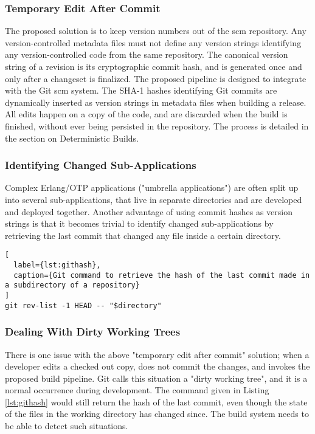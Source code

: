 \subsubsection{Temporary Edit After Commit}
The proposed solution is to keep version numbers out of the \acrfull{scm} repository. Any version-controlled metadata files must not define any version strings identifying any version-controlled code from the same repository. The canonical version string of a revision is its cryptographic commit hash, and is generated once and only after a changeset is finalized. The proposed pipeline is designed to integrate with the Git \acrshort{scm} system. The SHA-1 hashes identifying Git commits are dynamically inserted as version strings in metadata files when building a release. All edits happen on a copy of the code, and are discarded when the build is finished, without ever being persisted in the repository. The process is detailed in the section on Deterministic Builds.

\subsubsection{Identifying Changed Sub-Applications}
Complex Erlang/OTP applications ("umbrella applications") are often split up into several sub-applications, that live in separate directories and are developed and deployed together. Another advantage of using commit hashes as version strings is that it becomes trivial to identify changed sub-applications by retrieving the last commit that changed any file inside a certain directory.

\begin{lstlisting}[
  label={lst:githash},
  caption={Git command to retrieve the hash of the last commit made in a subdirectory of a repository}
]
git rev-list -1 HEAD -- "$directory"
\end{lstlisting}


\subsubsection{Dealing With Dirty Working Trees}
There is one issue with the above "temporary edit after commit" solution; when a developer edits a checked out copy, does not commit the changes, and invokes the proposed build pipeline. Git calls this situation a "dirty working tree", and it is a normal occurrence during development. The command given in Listing \ref{lst:githash} would still return the hash of the last commit, even though the state of the files in the working directory has changed since. The build system needs to be able to detect such situations.


